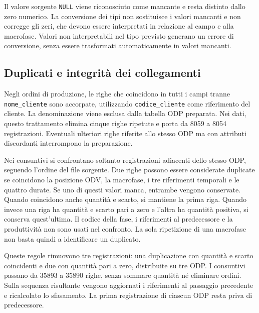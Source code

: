 Il valore sorgente \texttt{NULL} viene riconosciuto come mancante e resta distinto dallo zero numerico. La conversione dei tipi non sostituisce i valori mancanti e non corregge gli zeri, che devono essere interpretati in relazione al campo e alla macrofase. Valori non interpretabili nel tipo previsto generano un errore di conversione, senza essere trasformati automaticamente in valori mancanti.

\subsection{Duplicati e integrità dei collegamenti}
\label{sec:duplicates-and-data-links}

Negli ordini di produzione, le righe che coincidono in tutti i campi tranne \texttt{nome\_cliente} sono accorpate, utilizzando \texttt{codice\_cliente} come riferimento del cliente. La denominazione viene esclusa dalla tabella ODP preparata. Nei dati, questo trattamento elimina cinque righe ripetute e porta da \num{8059} a \num{8054} registrazioni. Eventuali ulteriori righe riferite allo stesso ODP ma con attributi discordanti interrompono la preparazione.

Nei consuntivi si confrontano soltanto registrazioni adiacenti dello stesso ODP, seguendo l'ordine del file sorgente. Due righe possono essere considerate duplicate se coincidono la posizione ODV, la macrofase, i tre riferimenti temporali e le quattro durate. Se uno di questi valori manca, entrambe vengono conservate. Quando coincidono anche quantità e scarto, si mantiene la prima riga. Quando invece una riga ha quantità e scarto pari a zero e l'altra ha quantità positiva, si conserva quest'ultima. Il codice della fase, i riferimenti al predecessore e la produttività non sono usati nel confronto. La sola ripetizione di una macrofase non basta quindi a identificare un duplicato.

Queste regole rimuovono tre registrazioni: una duplicazione con quantità e scarto coincidenti e due con quantità pari a zero, distribuite su tre ODP. I consuntivi passano da \num{35893} a \num{35890} righe, senza sommare quantità né eliminare ordini. Sulla sequenza risultante vengono aggiornati i riferimenti al passaggio precedente e ricalcolato lo sfasamento. La prima registrazione di ciascun ODP resta priva di predecessore.

